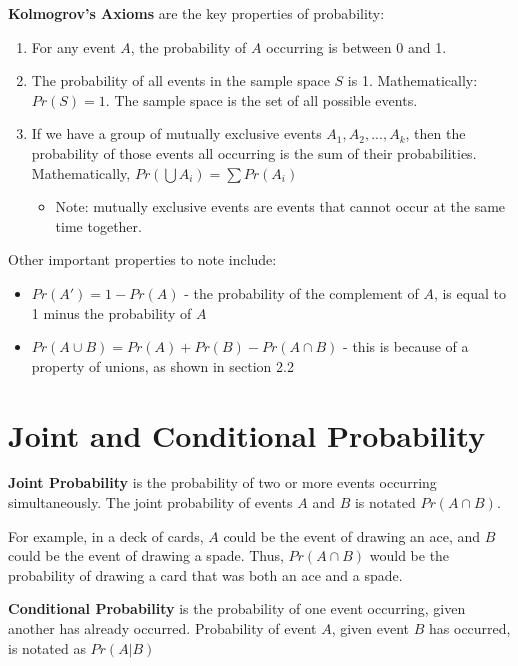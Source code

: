 \documentclass[
  a4paper,
]{report}
\providecommand{\tightlist}{%
  \setlength{\itemsep}{0pt}\setlength{\parskip}{0pt}}\usepackage{longtable,booktabs,array}
\begin{document}
\textbf{Kolmogrov's Axioms} are the key properties of probability:

\begin{enumerate}
\def\labelenumi{\arabic{enumi}.}
\tightlist
\item
  For any event \(A\), the probability of \(A\) occurring is between 0
  and 1.
\item
  The probability of all events in the sample space \(S\) is 1.
  Mathematically: \(Pr(S) = 1\). The sample space is the set of all
  possible events.
\item
  If we have a group of mutually exclusive events
  \(A_1, A_2, ... , A_k\), then the probability of those events all
  occurring is the sum of their probabilities. Mathematically,
  \(Pr \left( \bigcup A_i \right) = \sum Pr(A_i)\)

  \begin{itemize}
  \tightlist
  \item
    Note: mutually exclusive events are events that cannot occur at the
    same time together.
  \end{itemize}
\end{enumerate}

Other important properties to note include:

\begin{itemize}
\item
  \(Pr(A') = 1 - Pr(A)\) - the probability of the complement of \(A\),
  is equal to 1 minus the probability of \(A\)
\item
  \(Pr(A \cup B) = Pr(A) + Pr(B) - Pr(A \cap B)\) - this is because of a
  property of unions, as shown in section 2.2
\end{itemize}

\section{Joint and Conditional
Probability}\label{joint-and-conditional-probability}

\textbf{Joint Probability} is the probability of two or more events
occurring simultaneously. The joint probability of events \(A\) and
\(B\) is notated \(Pr(A \cap B)\).

For example, in a deck of cards, \(A\) could be the event of drawing an
ace, and \(B\) could be the event of drawing a spade. Thus,
\(Pr(A \cap B)\) would be the probability of drawing a card that was
both an ace and a spade.

\textbf{Conditional Probability} is the probability of one event
occurring, given another has already occurred. Probability of event
\(A\), given event \(B\) has occurred, is notated as \(Pr(A|B)\)
\end{document}
